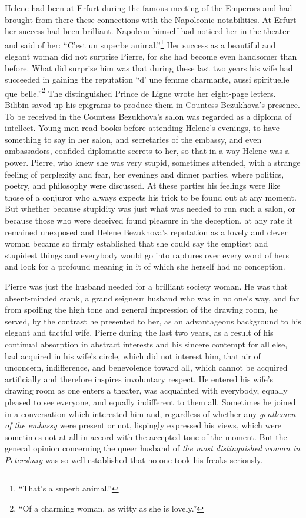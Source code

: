 Helene had been at Erfurt during the famous meeting of the
Emperors and had brought from there these connections with the
Napoleonic notabilities. At Erfurt her success had been
brilliant. Napoleon himself had noticed her in the theater and
said of her: ``C'est un superbe animal.''\footnote{``That's a
superb animal.''} Her success as a beautiful and elegant woman
did not surprise Pierre, for she had become even handsomer than
before. What did surprise him was that during these last two
years his wife had succeeded in gaining the reputation ``d' une
femme charmante, aussi spirituelle que belle.''\footnote{``Of a
charming woman, as witty as she is lovely.''}  The distinguished
Prince de Ligne wrote her eight-page letters. Bilibin saved up
his epigrams to produce them in Countess Bezukhova's presence. To
be received in the Countess Bezukhova's salon was regarded as a
diploma of intellect. Young men read books before attending
Helene's evenings, to have something to say in her salon, and
secretaries of the embassy, and even ambassadors, confided
diplomatic secrets to her, so that in a way Helene was a
power. Pierre, who knew she was very stupid, sometimes attended,
with a strange feeling of perplexity and fear, her evenings and
dinner parties, where politics, poetry, and philosophy were
discussed. At these parties his feelings were like those of a
conjuror who always expects his trick to be found out at any
moment. But whether because stupidity was just what was needed to
run such a salon, or because those who were deceived found
pleasure in the deception, at any rate it remained unexposed and
Helene Bezukhova's reputation as a lovely and clever woman became
so firmly established that she could say the emptiest and
stupidest things and everybody would go into raptures over every
word of hers and look for a profound meaning in it of which she
herself had no conception.

Pierre was just the husband needed for a brilliant society
woman. He was that absent-minded crank, a grand seigneur husband
who was in no one's way, and far from spoiling the high tone and
general impression of the drawing room, he served, by the
contrast he presented to her, as an advantageous background to
his elegant and tactful wife. Pierre during the last two years,
as a result of his continual absorption in abstract interests and
his sincere contempt for all else, had acquired in his wife's
circle, which did not interest him, that air of unconcern,
indifference, and benevolence toward all, which cannot be
acquired artificially and therefore inspires involuntary
respect. He entered his wife's drawing room as one enters a
theater, was acquainted with everybody, equally pleased to see
everyone, and equally indifferent to them all. Sometimes he
joined in a conversation which interested him and, regardless of
whether any \emph{gentlemen of the embassy} were present or not,
lispingly expressed his views, which were sometimes not at all in
accord with the accepted tone of the moment. But the general
opinion concerning the queer husband of \emph{the most distinguished
woman in Petersburg} was so well established that no one took
his freaks seriously.

